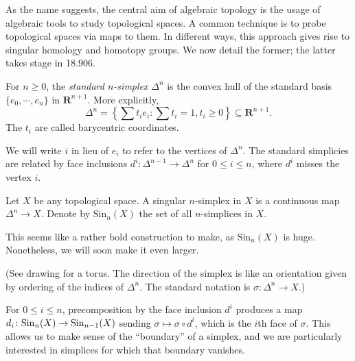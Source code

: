 As the name suggests, the central aim of algebraic topology is the usage of algebraic tools to study topological spaces. A common technique is to probe topological spaces via maps to them. In different ways, this approach gives rise to singular homology and homotopy groups. We now detail the former; the latter takes stage in 18.906.
\begin{definition}
For $n\geq 0$, the \emph{standard $n$-simplex} $\Delta^n$ is the convex hull of the standard basis $\{e_0,\cdots,e_n\}$ in $\mathbf{R}^{n+1}$. More explicitly,
$$\Delta^n = \left\{\sum t_i e_i : \sum t_i = 1, t_i\geq 0\right\}\subseteq\mathbf{R}^{n+1}.$$
The $t_i$ are called barycentric coordinates.
\end{definition}
We will write $i$ in lieu of $e_i$ to refer to the vertices of $\Delta^n$. The standard simplicies are related by face inclusions $d^i\colon \Delta^{n-1} \to \Delta^{n}$ for $0\leq i \leq n$, where $d^i$ misses the vertex $i$. 
\begin{definition}
Let $X$ be any topological space. A singular $n$-simplex in $X$ is a continuous map $\Delta^n\to X$. Denote by $\mathrm{Sin}_n(X)$ the set of all $n$-simplices in $X$.
    
    This seems like a rather bold construction to make, as $\mathrm{Sin}_n(X)$ is huge. Nonetheless, we will soon make it even larger.
\end{definition}
(See drawing for a torus. The direction of the simplex is like an orientation given by ordering of the indices of $\Delta^n$. The standard notation is $\sigma:\Delta^n\to X$.)

For $0\leq i \leq n$, precomposition by the face inclusion $d^i$ produces a map $d_i\colon \mathrm{Sin}_n(X)\to\mathrm{Sin}_{n-1}(X)$ sending $\sigma\mapsto\sigma\circ d^i$, which is the $i$th face of $\sigma$. This allows us to make sense of the ``boundary'' of a simplex, and we are particularly interested in simplices for which that boundary vanishes.

